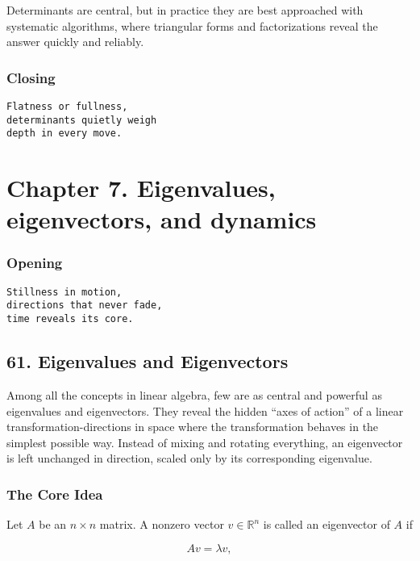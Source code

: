 \documentclass[
  letterpaper,
  DIV=11,
  numbers=noendperiod]{scrreprt}
\begin{document}
Determinants are central, but in practice they are best approached with
systematic algorithms, where triangular forms and factorizations reveal
the answer quickly and reliably.

\subsubsection{Closing}\label{closing-5}

\begin{verbatim}
Flatness or fullness,
determinants quietly weigh
depth in every move.
\end{verbatim}

\section{Chapter 7. Eigenvalues, eigenvectors, and
dynamics}\label{chapter-7.-eigenvalues-eigenvectors-and-dynamics-1}

\subsubsection{Opening}\label{opening-5}

\begin{verbatim}
Stillness in motion,
directions that never fade,
time reveals its core.
\end{verbatim}

\subsection{61. Eigenvalues and
Eigenvectors}\label{eigenvalues-and-eigenvectors}

Among all the concepts in linear algebra, few are as central and
powerful as eigenvalues and eigenvectors. They reveal the hidden ``axes
of action'' of a linear transformation-directions in space where the
transformation behaves in the simplest possible way. Instead of mixing
and rotating everything, an eigenvector is left unchanged in direction,
scaled only by its corresponding eigenvalue.

\subsubsection{The Core Idea}\label{the-core-idea-1}

Let \(A\) be an \(n \times n\) matrix. A nonzero vector
\(v \in \mathbb{R}^n\) is called an eigenvector of \(A\) if

\[
Av = \lambda v,
\]
\end{document}
